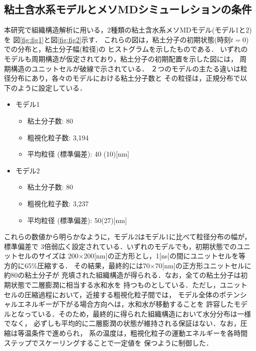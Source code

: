 \subsection{粘土含水系モデルとメソMDシミューレションの条件}
本研究で組織構造解析に用いる，2種類の粘土含水系メソMDモデル(モデル1と2)を
図\ref{fig:fig1}と図\ref{fig:fig2}示す．
これらの図は，粘土分子の初期状態(時刻$t=0$)での分布と，粘土分子幅(粒径)の
ヒストグラムを示したものである．
いずれのモデルも周期構造が仮定されており，粘土分子の初期配置を示した図には，
周期構造のユニットセルが破線で示されている．
２つのモデルの主たる違いは粒径分布にあり，各々のモデルにおける粘土分子数と
その粒径は，正規分布で以下のように設定している．
\begin{itemize}
\item
モデル1
	\begin{itemize}
		\item 粘土分子数: 80
		\item 粗視化粒子数: 3,194
		\item 平均粒径 (標準偏差): 40 (10)[{\rm nm}]
	\end{itemize}
\item
モデル2
	\begin{itemize}
		\item 粘土分子数: 80
		\item 粗視化粒子数: 3,237
		\item 平均粒径 (標準偏差): 50(27)[{\rm nm}]
	\end{itemize}
\end{itemize}
これらの数値から明らかなように，モデル2はモデル1に比べて粒径分布の幅が，標準偏差で
3倍弱広く設定されている．いずれのモデルでも，初期状態でのユニットセルのサイズは
200$\times$200[nm]の正方形とし，1[ns]の間にユニットセルを等方的に65\%圧縮する．
その結果，最終的には70$\times$70[nm]の正方形ユニットセルに約80の粘土分子が
充填された組織構造が得られる．なお，全ての粘土分子は初期状態で二層膨潤に相当する水和水を
持つものとしている．ただし，ユニットセルの圧縮過程において，近接する粗視化粒子間では，
モデル全体のポテンシャルエネルギーが下がる場合方向へは，水和水が移動することを
許容したモデルとなっている．そのため，最終的に得られた組織構造において水分分布は一様でなく，
必ずしも平均的に二層膨潤の状態が維持される保証はない．なお，圧縮は等温条件で進められ，
系の温度は，粗視化粒子の運動エネルギーを各時間ステップでスケーリングすることで一定値を
保つように制御した．

